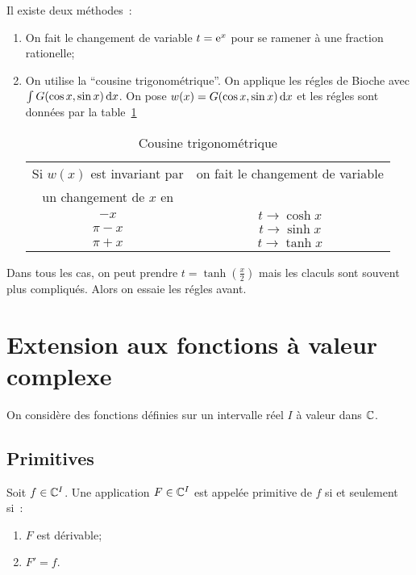 Il existe deux méthodes~:
\begin{enumerate}
  \item On fait le changement de variable \(t = \operatorname{e}^x\) pour se ramener à une
    fraction rationelle;
  \item On utilise la ``cousine trigonométrique''. On applique les régles de
    Bioche avec \(\int G(\cos x,\sin x)\mathop{}\mathopen{}\mathrm{d} x\). On pose \(w(x) = G(\cos x,\sin
    x) \mathop{}\mathopen{}\mathrm{d} x\) et les régles sont données par la table~\ref{tab:cousinetrigo}

    \begin{table}[!h]
      \centering
      \begin{tabular}{|c|c|}\hline
        Si \(w(x)\) est invariant par & on fait le changement de variable \\
        un changement de \(x\) en &  \\ \hline
        \(-x\) & \(t \to \cosh x\)\\
        \(\pi-x\) & \(t \to \sinh x\)\\
        \(\pi+x\) & \(t \to \tanh x\)\\
      \hline\end{tabular}
      \caption{Cousine trigonométrique}
      \label{tab:cousinetrigo}
    \end{table}
\end{enumerate}

Dans tous les cas, on peut prendre \(t = \tanh\left(\frac{x}{2}\right)\) mais les
claculs sont souvent plus compliqués. Alors on essaie les régles avant.

\section{Extension aux fonctions à valeur complexe}

On considère des fonctions définies sur un intervalle réel \(I\) à valeur dans
\(\mathbb{C}\).

\subsection{Primitives}

\begin{defdef}
  Soit \(f \in \mathbb{C}^I\). Une application \(F \in \mathbb{C}^I\) est appelée primitive de
  \(f\) si et seulement si~:
  \begin{enumerate}
    \item \(F\) est dérivable;
    \item \(F' = f\).
  \end{enumerate}
\end{defdef}

